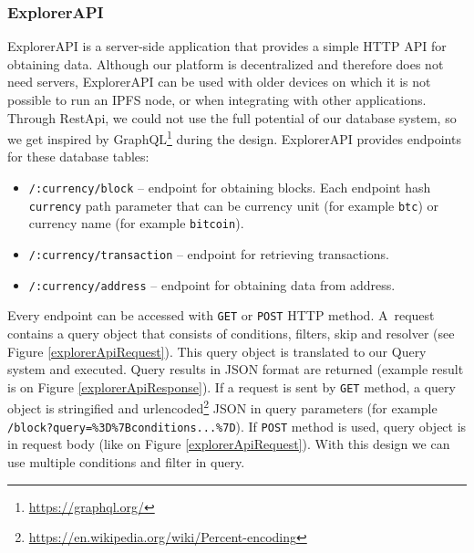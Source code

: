 \subsubsection{ExplorerAPI}
\label{explorerAPIroutes}
ExplorerAPI is a server-side application that provides a simple HTTP API for obtaining data. Although our platform is decentralized and therefore does not need servers, ExplorerAPI can be used with older devices on which it is not possible to run an IPFS node, or when integrating with other applications. Through RestApi, we could not use the full potential of our database system, so we get inspired by GraphQL\footnote{\url{https://graphql.org/}} during the design. ExplorerAPI provides endpoints for these database tables:
\begin{itemize}
    \item \texttt{/:currency/block} -- endpoint for obtaining blocks. Each endpoint hash \texttt{currency} path parameter that can be currency unit (for example \texttt{btc}) or currency name (for example \texttt{bitcoin}).
    \item \texttt{/:currency/transaction} -- endpoint for retrieving transactions.  
    \item \texttt{/:currency/address} -- endpoint for obtaining data from address.
\end{itemize}
Every endpoint can be accessed with \texttt{GET} or \texttt{POST} HTTP method. A~request contains a query object that consists of conditions, filters, skip and resolver (see Figure \ref{explorerApiRequest}). This query object is translated to our Query system and executed. Query results in JSON format are returned (example result is on Figure \ref{explorerApiResponse}). If a request is sent by \texttt{GET} method, a query object is stringified and urlencoded\footnote{\url{https://en.wikipedia.org/wiki/Percent-encoding}} JSON in query parameters (for example \texttt{/block?query=\%3D\%7Bconditions...\%7D}). If \texttt{POST} method is used, query object is in request body (like on Figure \ref{explorerApiRequest}). With this design we can use multiple conditions and filter in query. 





